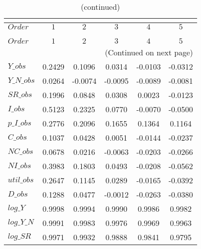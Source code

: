  
\begin{center}
\begin{longtable}{lccccc} 
\caption{COEFFICIENTS OF AUTOCORRELATION}\\
 \label{Table:th_autocorr_matrix}\\
\toprule 
$Order      $	 & 	 $         1$	 & 	 $         2$	 & 	 $         3$	 & 	 $         4$	 & 	 $         5$\\
\midrule \endfirsthead 
\caption{(continued)}\\
 \toprule \\ 
$Order      $	 & 	 $         1$	 & 	 $         2$	 & 	 $         3$	 & 	 $         4$	 & 	 $         5$\\
\midrule \endhead 
\midrule \multicolumn{6}{r}{(Continued on next page)} \\ \bottomrule \endfoot 
\bottomrule \endlastfoot 
$Y\_obs     $	 & 	    0.2429	 & 	    0.1096	 & 	    0.0314	 & 	   -0.0103	 & 	   -0.0312 \\ 
$Y\_N\_obs  $	 & 	    0.0264	 & 	   -0.0074	 & 	   -0.0095	 & 	   -0.0089	 & 	   -0.0081 \\ 
$SR\_obs    $	 & 	    0.1996	 & 	    0.0848	 & 	    0.0308	 & 	    0.0023	 & 	   -0.0123 \\ 
$I\_obs     $	 & 	    0.5123	 & 	    0.2325	 & 	    0.0770	 & 	   -0.0070	 & 	   -0.0500 \\ 
$p\_I\_obs  $	 & 	    0.2776	 & 	    0.2096	 & 	    0.1655	 & 	    0.1364	 & 	    0.1164 \\ 
$C\_obs     $	 & 	    0.1037	 & 	    0.0428	 & 	    0.0051	 & 	   -0.0144	 & 	   -0.0237 \\ 
$NC\_obs    $	 & 	    0.0678	 & 	    0.0216	 & 	   -0.0063	 & 	   -0.0203	 & 	   -0.0266 \\ 
$NI\_obs    $	 & 	    0.3983	 & 	    0.1803	 & 	    0.0493	 & 	   -0.0208	 & 	   -0.0562 \\ 
$util\_obs  $	 & 	    0.2647	 & 	    0.1145	 & 	    0.0289	 & 	   -0.0165	 & 	   -0.0392 \\ 
$D\_obs     $	 & 	    0.1288	 & 	    0.0477	 & 	   -0.0012	 & 	   -0.0263	 & 	   -0.0380 \\ 
$log\_Y     $	 & 	    0.9998	 & 	    0.9994	 & 	    0.9990	 & 	    0.9986	 & 	    0.9982 \\ 
$log\_Y\_N  $	 & 	    0.9991	 & 	    0.9983	 & 	    0.9976	 & 	    0.9969	 & 	    0.9963 \\ 
$log\_SR    $	 & 	    0.9971	 & 	    0.9932	 & 	    0.9888	 & 	    0.9841	 & 	    0.9795 \\ 

\end{longtable}
\end{center}
